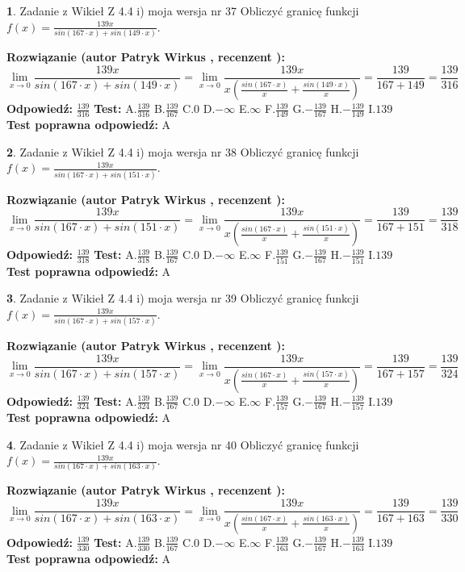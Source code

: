 \documentclass[12pt, a4paper]{article}
\theoremstyle{definition} %
\newtheorem{zad}{}
\newcommand{\zadStart}[1]{\begin{zad}#1\newline}
\newcommand{\zadStop}{\end{zad}}
\newcommand{\rozwStart}[2]{\noindent \textbf{Rozwiązanie (autor #1 , recenzent #2): }\newline}
\newcommand{\rozwStop}{\newline}
\newcommand{\odpStart}{\noindent \textbf{Odpowiedź:}\newline}
\newcommand{\odpStop}{\newline}
\newcommand{\testStart}{\noindent \textbf{Test:}\newline}
\newcommand{\testStop}{\newline}
\newcommand{\kluczStart}{\noindent \textbf{Test poprawna odpowiedź:}\newline}
\newcommand{\kluczStop}{\newline}
\begin{document}
\zadStart{Zadanie z Wikieł Z 4.4 i) moja wersja nr 37}
Obliczyć granicę funkcji $f(x)=\frac{139x}{sin(167\cdot x) +sin(149\cdot x)}$.
\zadStop
\rozwStart{Patryk Wirkus}{}
$$\lim\limits_{x\to 0}\frac{139x}{sin(167\cdot x) +sin(149\cdot x)}=\lim\limits_{x\to 0}\frac{139x}{x(\frac{sin(167\cdot x)}{x}+\frac{sin(149\cdot x)}{x})}=\frac{139}{167+149} = \frac{139}{316}$$
\rozwStop
\odpStart
$\frac{139}{316}$
\odpStop
\testStart
A.$\frac{139}{316}$
B.$\frac{139}{167}$
C.$0$
D.$-\infty$
E.$\infty$
F.$\frac{139}{149}$
G.$-\frac{139}{167}$
H.$-\frac{139}{149}$
I.$139$
\testStop
\kluczStart
A
\kluczStop



\zadStart{Zadanie z Wikieł Z 4.4 i) moja wersja nr 38}
Obliczyć granicę funkcji $f(x)=\frac{139x}{sin(167\cdot x) +sin(151\cdot x)}$.
\zadStop
\rozwStart{Patryk Wirkus}{}
$$\lim\limits_{x\to 0}\frac{139x}{sin(167\cdot x) +sin(151\cdot x)}=\lim\limits_{x\to 0}\frac{139x}{x(\frac{sin(167\cdot x)}{x}+\frac{sin(151\cdot x)}{x})}=\frac{139}{167+151} = \frac{139}{318}$$
\rozwStop
\odpStart
$\frac{139}{318}$
\odpStop
\testStart
A.$\frac{139}{318}$
B.$\frac{139}{167}$
C.$0$
D.$-\infty$
E.$\infty$
F.$\frac{139}{151}$
G.$-\frac{139}{167}$
H.$-\frac{139}{151}$
I.$139$
\testStop
\kluczStart
A
\kluczStop



\zadStart{Zadanie z Wikieł Z 4.4 i) moja wersja nr 39}
Obliczyć granicę funkcji $f(x)=\frac{139x}{sin(167\cdot x) +sin(157\cdot x)}$.
\zadStop
\rozwStart{Patryk Wirkus}{}
$$\lim\limits_{x\to 0}\frac{139x}{sin(167\cdot x) +sin(157\cdot x)}=\lim\limits_{x\to 0}\frac{139x}{x(\frac{sin(167\cdot x)}{x}+\frac{sin(157\cdot x)}{x})}=\frac{139}{167+157} = \frac{139}{324}$$
\rozwStop
\odpStart
$\frac{139}{324}$
\odpStop
\testStart
A.$\frac{139}{324}$
B.$\frac{139}{167}$
C.$0$
D.$-\infty$
E.$\infty$
F.$\frac{139}{157}$
G.$-\frac{139}{167}$
H.$-\frac{139}{157}$
I.$139$
\testStop
\kluczStart
A
\kluczStop



\zadStart{Zadanie z Wikieł Z 4.4 i) moja wersja nr 40}
Obliczyć granicę funkcji $f(x)=\frac{139x}{sin(167\cdot x) +sin(163\cdot x)}$.
\zadStop
\rozwStart{Patryk Wirkus}{}
$$\lim\limits_{x\to 0}\frac{139x}{sin(167\cdot x) +sin(163\cdot x)}=\lim\limits_{x\to 0}\frac{139x}{x(\frac{sin(167\cdot x)}{x}+\frac{sin(163\cdot x)}{x})}=\frac{139}{167+163} = \frac{139}{330}$$
\rozwStop
\odpStart
$\frac{139}{330}$
\odpStop
\testStart
A.$\frac{139}{330}$
B.$\frac{139}{167}$
C.$0$
D.$-\infty$
E.$\infty$
F.$\frac{139}{163}$
G.$-\frac{139}{167}$
H.$-\frac{139}{163}$
I.$139$
\testStop
\kluczStart
A
\kluczStop
\end{document}
